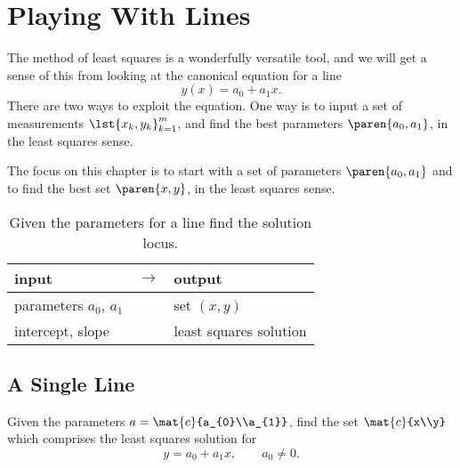 \chapter{Playing With Lines}

The method of least squares is a wonderfully versatile tool, and we will get a sense of this from looking at the canonical equation for a line
  \begin{equation*}   %
      y(x) = a_{0} + a_{1} x.
  \end{equation*}
There are two ways to exploit the equation. One way is to input a set of measurements $\lst{x_{k},y_{k}}_{k=1}^{m}$, and find the best parameters $\paren{a_{0},a_{1}}$, in the least squares sense. 

The focus on this chapter is to start with a set of parameters $\paren{a_{0},a_{1}}$ and to find the best set $\paren{x, y}$, in the least squares sense.	

\begin{table}[htbp]  %
    \caption{Given the parameters for a line find the solution locus.}
    \begin{center}
        \begin{tabular}{lcl}
            input & $\rightarrow$ & output \\\hline
            parameters $a_{0}$, $a_{1}$ && set $(x, y)$\\
			intercept, slope && least squares solution
        \end{tabular}
    \end{center}
\end{table}%


\section{A Single Line}  %

Given the parameters $a=\mat{c}{a_{0}\\a_{1}}$, find the set $\mat{c}{x\\y}$ which comprises the least squares solution for
  \begin{equation}   %
      y = a_{0} + a_{1} x, \qquad a_{0} \ne 0.
   \label{eq:myline}
  \end{equation}


